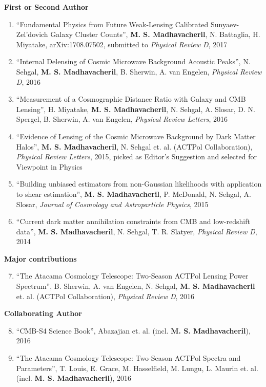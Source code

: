 \documentclass[10pt,margin]{res}
\begin{document}
\begin{resume}
\textbf{First or Second Author}
\\
\begin{enumerate}
\item ``Fundamental Physics from Future Weak-Lensing Calibrated Sunyaev-Zel'dovich Galaxy Cluster Counts'', {\bf M. S. Madhavacheril}, N. Battaglia, H. Miyatake, arXiv:1708.07502, submitted to {\sl Physical Review D}, 2017
\item ``Internal Delensing of Cosmic Microwave Background Acoustic Peaks'', N. Sehgal, {\bf M. S. Madhavacheril}, B. Sherwin, A. van Engelen, {\sl Physical Review D}, 2016
\item ``Measurement of a Cosmographic Distance Ratio with Galaxy and CMB Lensing'', H. Miyatake, {\bf M. S. Madhavacheril}, N. Sehgal, A. Slosar, D. N. Spergel, B. Sherwin, A. van Engelen, {\sl Physical Review Letters}, 2016
\item ``Evidence of Lensing of the Cosmic Microwave Background by Dark Matter Halos'', {\bf M. S. Madhavacheril}, N. Sehgal et. al. (ACTPol Collaboration), {\sl Physical Review Letters}, 2015, picked as Editor's Suggestion and selected for Viewpoint in Physics
\item ``Building unbiased estimators from non-Gaussian likelihoods with application to shear estimation'', {\bf M. S. Madhavacheril}, P. McDonald, N. Sehgal, A. Slosar, {\sl Journal of Cosmology and Astroparticle Physics}, 2015
\item ``Current dark matter annihilation constraints from CMB and low-redshift data'', {\bf M. S. Madhavacheril}, N. Sehgal, T. R. Slatyer, {\sl Physical Review D}, 2014
\end{enumerate}
\textbf{Major contributions}
\\
\begin{enumerate}
\setcounter{enumi}{6}
\item ``The Atacama Cosmology Telescope: Two-Season ACTPol Lensing Power Spectrum'', B. Sherwin, A. van Engelen, N. Sehgal, {\bf M. S. Madhavacheril} et. al. (ACTPol Collaboration), {\sl Physical Review D}, 2016
\end{enumerate}
\textbf{Collaborating Author}
\\
\begin{enumerate}
\setcounter{enumi}{7}
\item ``CMB-S4 Science Book'', Abazajian et. al. (incl. {\bf M. S. Madhavacheril}), 2016
\item ``The Atacama Cosmology Telescope: Two-Season ACTPol Spectra and Parameters'', T. Louis, E. Grace, M. Hasselfield, M. Lungu, L.  Maurin et. al. (incl. {\bf M. S. Madhavacheril}), 2016

\end{enumerate}
\end{resume}
\end{document}
